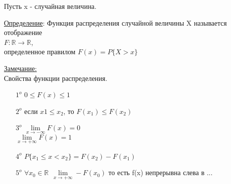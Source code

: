 
Пусть x - случайная величина.

\underline{Определение}: Функция распределения случайной величины X называется отображение \\
$F: \mathbb{R} \rightarrow \mathbb{R}$, \\
определенное правилом $F(x) = P\{X > x\}$

\underline{Замечание:} \\

Свойства функции распределения. \\
\begin{enumerate}
	\item[$1^o$]
	$0 \leqslant F(x) \leqslant 1$ \\
	
	\item[$2^o$]
	если $x1 \leqslant x_2$, то $F(x_1) \leqslant F(x_2)$ \\
	
	\item[$3^o$]
	$ \lim\limits_{x \to -\infty} F(x) = 0$ \\
	$\lim\limits_{x \to +\infty} F(x) = 1$ \\
	
	\item[$4^o$]
	$P\{x_1 \leqslant x < x_2\} = F(x_2) - F(x_1)$ \\
	
	\item[$5^o$]
	$\forall x_0 \in \mathbb{R} \ \ \lim\limits_{x \to +\infty} - F(x_0)$ то есть f(x) непрерывна слева в ...
\end{enumerate}

